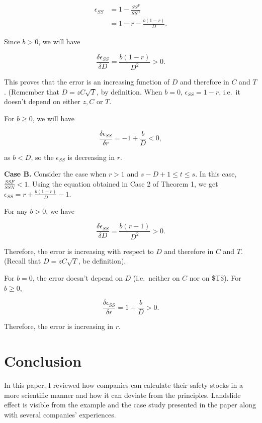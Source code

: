 \documentclass[,msom,nonblindrev]{informs}
\begin{document}
\begin{align}
\epsilon_{SS} &= 1 - \frac{SS^F}{SS^N}\\
&= 1 - r - \frac{b(1-r)}{D}.
\end{align}

Since \(b>0\), we will have

\[
\frac{\delta \epsilon_{SS}}{\delta D} = \frac{b(1-r)}{D^2} >0.
\]

This proves that the error is an increasing function of \(D\) and
therefore in \(C\) and \(T\). (Remember that \(D = zC\sqrt{T}\), by
definition. When \(b = 0\), \(\epsilon_{SS} = 1-r\), i.e.~it doesn't
depend on either \(z, C\) or \(T\).

For \(b \geq 0\), we will have

\[
\frac{\delta \epsilon_{SS}}{\delta r} = -1 + \frac{b}{D} < 0,
\]

as \(b < D\), so the \(\epsilon_{SS}\) is decreasing in \(r\).

\textbf{Case B.} Consider the case when \(r>1\) and
\(s-D+1\leq t \leq s\). In this case, \(\frac{SSF}{SSN}<1\). Using the
equation obtained in Case 2 of Theorem 1, we get
\(\epsilon_{SS} = r + \frac{b(1-r)}{D} - 1\).

For any \(b>0\), we have

\[
\frac{\delta \epsilon_{SS}}{\delta D} = \frac{b(r-1)}{D^2} > 0.
\]

Therefore, the error is increasing with respect to \(D\) and therefore
in \(C\) and \(T\). (Recall that \(D = zC\sqrt{T}\), be definition).

For \(b=0\), the error doesn't depend on \(D\) (i.e.~neither on \(C\)
nor on \$T\$). For \(b \geq 0\),

\[
\frac{\delta \epsilon_{SS}}{\delta r} = 1 + \frac{b}{D} > 0.
\]

Therefore, the error is increasing in \(r\).

\hypertarget{conclusion}{%
\section{Conclusion}\label{conclusion}}

In this paper, I reviewed how companies can calculate their safety
stocks in a more scientific manner and how it can deviate from the
principles. Landslide effect is visible from the example and the case
study presented in the paper along with several companies' experiences.
\end{document}
